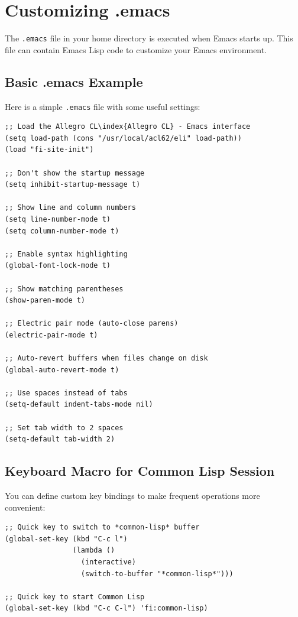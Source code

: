 \section{Customizing .emacs}

The \texttt{.emacs} file in your home directory is executed when Emacs starts up. This file can
contain Emacs Lisp code to customize your Emacs environment.

\subsection{Basic .emacs Example}

Here is a simple \texttt{.emacs} file with some useful settings:

\begin{verbatim}
;; Load the Allegro CL\index{Allegro CL} - Emacs interface
(setq load-path (cons "/usr/local/acl62/eli" load-path))
(load "fi-site-init")

;; Don't show the startup message
(setq inhibit-startup-message t)

;; Show line and column numbers
(setq line-number-mode t)
(setq column-number-mode t)

;; Enable syntax highlighting
(global-font-lock-mode t)

;; Show matching parentheses
(show-paren-mode t)

;; Electric pair mode (auto-close parens)
(electric-pair-mode t)

;; Auto-revert buffers when files change on disk
(global-auto-revert-mode t)

;; Use spaces instead of tabs
(setq-default indent-tabs-mode nil)

;; Set tab width to 2 spaces
(setq-default tab-width 2)
\end{verbatim}

\subsection{Keyboard Macro for Common Lisp Session}

You can define custom key bindings to make frequent operations more convenient:

\begin{verbatim}
;; Quick key to switch to *common-lisp* buffer
(global-set-key (kbd "C-c l")
                (lambda ()
                  (interactive)
                  (switch-to-buffer "*common-lisp*")))

;; Quick key to start Common Lisp
(global-set-key (kbd "C-c C-l") 'fi:common-lisp)
\end{verbatim}

